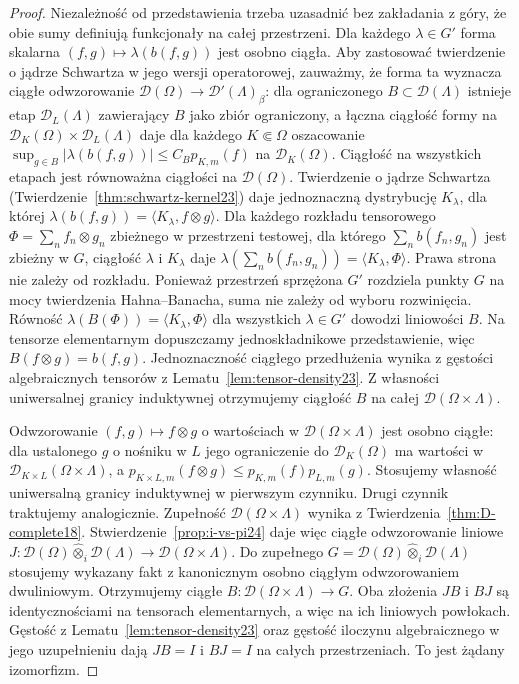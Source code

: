 \begin{proof}
Niezależność od przedstawienia trzeba uzasadnić bez
zakładania z góry, że obie sumy definiują funkcjonały
na całej przestrzeni. Dla każdego $\lambda\in G'$ forma
skalarna $(f,g)\mapsto\lambda(b(f,g))$ jest osobno ciągła.
Aby zastosować twierdzenie o jądrze Schwartza w jego
wersji operatorowej, zauważmy, że forma ta wyznacza
ciągłe odwzorowanie $\mathcal D(\Omega)\to
\mathcal D'(\Lambda)_\beta$: dla ograniczonego
$B\subset\mathcal D(\Lambda)$ istnieje etap
$\mathcal D_L(\Lambda)$ zawierający $B$ jako zbiór
ograniczony, a łączna ciągłość formy na
$\mathcal D_K(\Omega)\times\mathcal D_L(\Lambda)$
daje dla każdego $K\Subset\Omega$ oszacowanie
$\sup_{g\in B}|\lambda(b(f,g))|\le C_B p_{K,m}(f)$
na $\mathcal D_K(\Omega)$. Ciągłość na wszystkich
etapach jest równoważna ciągłości na $\mathcal D(\Omega)$.
Twierdzenie o jądrze Schwartza
(Twierdzenie~\ref{thm:schwartz-kernel23}) daje
jednoznaczną dystrybucję $K_\lambda$, dla której
$\lambda(b(f,g))=\langle K_\lambda,f\otimes g\rangle$.
Dla każdego rozkładu tensorowego
$\Phi=\sum_n f_n\otimes g_n$ zbieżnego w przestrzeni
testowej, dla którego $\sum_n b(f_n,g_n)$ jest
zbieżny w $G$, ciągłość $\lambda$ i $K_\lambda$ daje
$\lambda(\sum_n b(f_n,g_n))=\langle K_\lambda,\Phi\rangle$.
Prawa strona nie zależy od rozkładu. Ponieważ przestrzeń sprzężona $G'$ rozdziela punkty
$G$ na mocy twierdzenia Hahna--Banacha, suma nie zależy
od wyboru rozwinięcia. Równość
$\lambda(B(\Phi))=\langle K_\lambda,\Phi\rangle$
dla wszystkich $\lambda\in G'$ dowodzi liniowości $B$.
Na tensorze elementarnym dopuszczamy jednoskładnikowe
przedstawienie, więc $B(f\otimes g)=b(f,g)$.
Jednoznaczność ciągłego przedłużenia wynika z gęstości
algebraicznych tensorów z Lematu~\ref{lem:tensor-density23}.
Z własności uniwersalnej granicy induktywnej otrzymujemy
ciągłość $B$ na całej $\mathcal D(\Omega\times\Lambda)$.

Odwzorowanie $(f,g)\mapsto f\otimes g$ o wartościach
w $\mathcal D(\Omega\times\Lambda)$ jest osobno ciągłe:
dla ustalonego $g$ o nośniku w $L$ jego ograniczenie
do $\mathcal D_K(\Omega)$ ma wartości w
$\mathcal D_{K\times L}(\Omega\times\Lambda)$, a
$p_{K\times L,m}(f\otimes g)\le p_{K,m}(f)p_{L,m}(g)$.
Stosujemy własność uniwersalną granicy induktywnej
w pierwszym czynniku. Drugi czynnik traktujemy analogicznie.
Zupełność $\mathcal D(\Omega\times\Lambda)$ wynika z
Twierdzenia~\ref{thm:D-complete18}.
Stwierdzenie~\ref{prop:i-vs-pi24} daje więc ciągłe
odwzorowanie liniowe
$J:\mathcal D(\Omega)\widehat\otimes_i\mathcal D(\Lambda)
\to\mathcal D(\Omega\times\Lambda)$.
Do zupełnego $G=\mathcal D(\Omega)\widehat\otimes_i
\mathcal D(\Lambda)$ stosujemy wykazany fakt z
kanonicznym osobno ciągłym odwzorowaniem dwuliniowym.
Otrzymujemy ciągłe $B:\mathcal D(\Omega\times\Lambda)\to G$.
Oba złożenia $JB$ i $BJ$ są identycznościami
na tensorach elementarnych, a więc na ich liniowych
powłokach. Gęstość z Lematu~\ref{lem:tensor-density23}
oraz gęstość iloczynu algebraicznego w jego uzupełnieniu
dają $JB=I$ i $BJ=I$ na całych przestrzeniach.
To jest żądany izomorfizm.
\end{proof}


